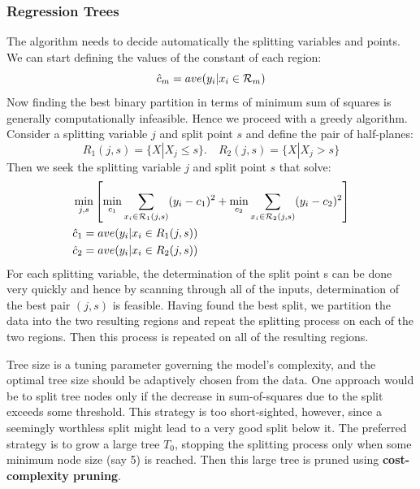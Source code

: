 \subsubsection{Regression Trees}
The algorithm needs to decide automatically the splitting variables and points. We can start defining the values of the constant of each region:
\begin{equation}
\hat{c}_m = ave(y_i|x_i \in \CMcal{R}_m)
\end{equation}
Now finding the best binary partition in terms of minimum sum of squares is generally computationally infeasible. Hence we proceed with a greedy algorithm. Consider a splitting variable $j$ and split point $s$ and define the pair of half-planes:
\begin{equation}
R_1(j,s) = \{X|X_j \le s \}. \quad R_2(j,s) = \{X|X_j > s \}
\end{equation}
Then we seek the splitting variable $j$ and split point $s$ that solve:
\begin{equation}
\begin{aligned}
&\min_{j,s}\left[ \min_{c_1} \sum_{x_i \in \CMcal{R}_1(j,s)}  (y_i-c_1)^2 + \min_{c_2} \sum_{x_i \in \CMcal{R}_2(j,s)}  (y_i-c_2)^2\right]\\
&\hat{c}_1 = ave (y_i|x_i \in R_1(j,s)) \\
&\hat{c}_2 = ave (y_i|x_i \in R_2(j,s)) 
\end{aligned}
\end{equation}
For each splitting variable, the determination of the split point s can be done very quickly and hence by scanning through all of the inputs, determination of the best pair $(j, s)$ is feasible. Having found the best split, we partition the data into the two resulting regions and repeat the splitting process on each of the two regions. Then this process is repeated on all of the resulting regions.


Tree size is a tuning parameter governing the model's complexity, and the optimal tree size should be adaptively chosen from the data. One approach would be to split tree nodes only if the decrease in sum-of-squares due to the split exceeds some threshold. This strategy is too short-sighted, however, since a seemingly worthless split might lead to a very good split below it.
The preferred strategy is to grow a large tree $T_0$, stopping the splitting process only when some minimum node size (say 5) is reached. Then this large tree is pruned using \textbf{cost-complexity pruning}.

